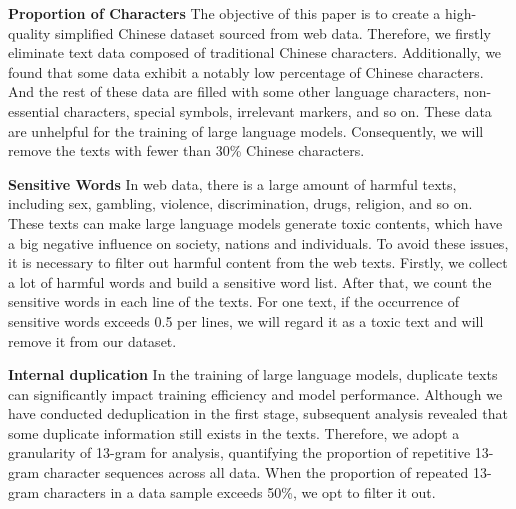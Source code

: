 \documentclass{article}
\begin{document}
\textbf{Proportion of Characters} The objective of this paper is to create a high-quality simplified Chinese dataset sourced from web data. Therefore, we firstly eliminate text data composed of traditional Chinese characters. Additionally, we found that some data exhibit a notably low percentage of Chinese characters. And the rest of these data are filled with some other language characters, non-essential characters, special symbols, irrelevant markers, and so on. These data are unhelpful for the training of large language models. Consequently, we will remove the texts with fewer than 30\% Chinese characters.

\textbf{Sensitive Words} In web data, there is a large amount of harmful texts, including sex, gambling, violence, discrimination, drugs, religion, and so on.  These texts can make large language models generate toxic contents, which have a big negative influence on society, nations and individuals. To avoid these issues, it is necessary to filter out harmful content from the web texts. Firstly, we collect a lot of harmful words and build a sensitive word list. After that, we count the sensitive words in each line of the texts. For one text, if the occurrence of sensitive words exceeds 0.5 per lines, we will regard it as a toxic text and will remove it from our dataset.



\textbf{Internal duplication}
In the training of large language models, duplicate texts can significantly impact training efficiency and model performance. Although we have conducted deduplication in the first stage, subsequent analysis revealed that some duplicate information still exists in the texts. Therefore, we adopt a granularity of 13-gram for analysis, quantifying the proportion of repetitive 13-gram character sequences across all data. When the proportion of repeated 13-gram characters in a data sample exceeds 50\%, we opt to filter it out.
\end{document}
